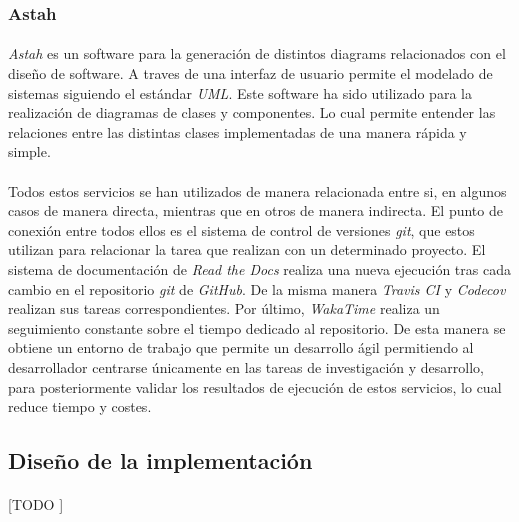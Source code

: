 \documentclass{subfiles}
\begin{document}
        \subsubsection{Astah}
        \label{sec:astah}

          \paragraph{}
          \emph{Astah} es un software para la generación de distintos diagrams relacionados con el diseño de software. A traves de una interfaz de usuario permite el modelado de sistemas siguiendo el estándar \emph{UML}. Este software ha sido utilizado para la realización de diagramas de clases y componentes. Lo cual permite entender las relaciones entre las distintas clases implementadas de una manera rápida y simple.

        \paragraph{}
        Todos estos servicios se han utilizados de manera relacionada entre si, en algunos casos de manera directa, mientras que en otros de manera indirecta. El punto de conexión entre todos ellos es el sistema de control de versiones \emph{git}, que estos utilizan para relacionar la tarea que realizan con un determinado proyecto. El sistema de documentación de \emph{Read the Docs} realiza una nueva ejecución tras cada cambio en el repositorio \emph{git} de \emph{GitHub}. De la misma manera \emph{Travis CI} y \emph{Codecov} realizan sus tareas correspondientes. Por último, \emph{WakaTime} realiza un seguimiento constante sobre el tiempo dedicado al repositorio. De esta manera se obtiene un entorno de trabajo que permite un desarrollo ágil permitiendo al desarrollador centrarse únicamente en las tareas de investigación y desarrollo, para posteriormente validar los resultados de ejecución de estos servicios, lo cual reduce tiempo y costes.

      \subsection{Diseño de la implementación}
      \label{sec:implementation_design}

        \paragraph{}
        [TODO ]
\end{document}
